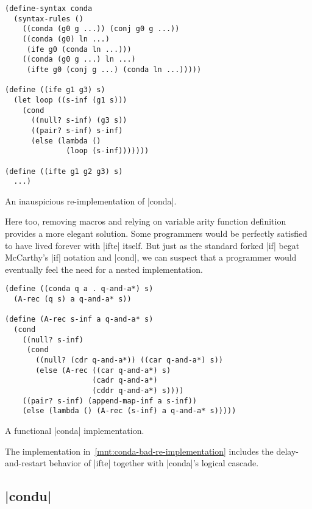 \documentclass[sigplan,screen,draft,anonymous,review,natbib=false]{acmart}
\begin{document}
\begin{listing}
  \begin{verbatim}
(define-syntax conda
  (syntax-rules ()
    ((conda (g0 g ...)) (conj g0 g ...))
    ((conda (g0) ln ...)
     (ife g0 (conda ln ...)))
    ((conda (g0 g ...) ln ...)
     (ifte g0 (conj g ...) (conda ln ...)))))

(define ((ife g1 g3) s)
  (let loop ((s-inf (g1 s)))
    (cond
      ((null? s-inf) (g3 s))
      ((pair? s-inf) s-inf)
      (else (lambda ()
              (loop (s-inf)))))))

(define ((ifte g1 g2 g3) s)
  ...)
  \end{verbatim}
  \caption{An inauspicious re-implementation of \rackinline|conda|.}
  \label{mnt:conda-bad-re-implementation}
\end{listing}

Here too, removing macros and relying on variable arity function
definition provides a more elegant solution. Some programmers would be
perfectly satisfied to have lived forever with \rackinline|ifte|
itself. But just as the standard forked \rackinline|if| begat
McCarthy's \rackinline|if| notation and \rackinline|cond|, we can
suspect that a programmer would eventually feel the need for a nested
implementation.

\begin{listing}
  \begin{verbatim}
(define ((conda q a . q-and-a*) s)
  (A-rec (q s) a q-and-a* s))

(define (A-rec s-inf a q-and-a* s)
  (cond
    ((null? s-inf)
     (cond
       ((null? (cdr q-and-a*)) ((car q-and-a*) s))
       (else (A-rec ((car q-and-a*) s)
                    (cadr q-and-a*)
                    (cddr q-and-a*) s))))
    ((pair? s-inf) (append-map-inf a s-inf))
    (else (lambda () (A-rec (s-inf) a q-and-a* s)))))
  \end{verbatim}
  \caption{A functional \rackinline|conda| implementation.}
  \label{mnt:conda-bad-re-implementation}
\end{listing}

The implementation in~\cref{mnt:conda-bad-re-implementation} includes
the delay-and-restart behavior of \rackinline|ifte| together with
\rackinline|conda|'s logical cascade.

\subsection{\rackinline|condu|}
\end{document}
